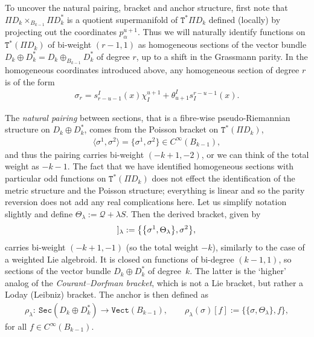 \documentclass[10pt,a4paper]{amsart}
\newcommand{\Dleft}{[\hspace{-1.5pt}[}
\newcommand{\Dright}{]\hspace{-1.5pt}]}
\newcommand{\SN}[1]{\Dleft #1 \Dright}
\def\Sec{\mathtt{Sec}}
\def\Vect{\mathtt{Vect}}
\def\sT{{\mathtt T}}
\numberwithin{equation}{section}
\begin{document}
To uncover the natural pairing, bracket and anchor structure, f\/irst note that $\Pi D_{k} \times_{B_{k-1}} \Pi D_{k}^{*}$ is a  quotient supermanifold of $\sT^{*}\Pi D_{k}$ def\/ined (locally) by projecting out the coordinates $p^{u+1}_{\alpha}$. Thus we will naturally identify functions on $\sT^{*}(\Pi D_{k})$ of bi-weight $(r-1,1)$ as homogeneous sections of  the vector bundle $D_k\oplus D^*_k=D_{k}\oplus_{B_{k-1}} D_{k}^{*}$ of degree $r$, up to a shift in the Grassmann parity.  In the homogeneous coordinates introduced above, any homogeneous section of degree $r$ is of the form
\begin{gather*}
\sigma_{r} = s_{r-u-1}^{I}(x)\chi_{I}^{u+1} + \theta_{u+1}^{I}s_{I}^{r-u-1}(x).
\end{gather*}


The \emph{natural pairing} between sections, that is a f\/ibre-wise pseudo-Riemannian structure on $D_{k}\oplus D_{k}^{*}$,  comes from the Poisson bracket on $\sT^{*}(\Pi D_{k})$,
\begin{gather*}
\langle\sigma^{1}, \sigma^{2} \rangle = \big\{ \sigma^{1}, \sigma^{2} \big\} \in C^{\infty}(B_{k-1}),
\end{gather*}
 and thus the pairing carries bi-weight $(-k+1, -2)$, or we can think of the  total weight as $-k-1$. The fact that we have identif\/ied homogeneous sections with particular odd functions on  $\sT^{*}(\Pi D_{k})$ does not ef\/fect the identif\/ication of the metric structure and the Poisson structure; everything is linear and so the parity reversion does not add any real complications here.
Let us simplify notation slightly and def\/ine  $\Theta_{\lambda} :=  \mathcal{Q} + \lambda   S$.  Then the  derived bracket, given by
\begin{gather*}
\SN{\sigma^{1}, \sigma^{2}}_{\lambda} :=  \big\{\big\{ \sigma^{1}, \Theta_{\lambda} \big\}, \sigma^{2} \big\},
\end{gather*}
carries bi-weight $(-k+1, -1)$  (so the total weight $-k$), similarly to the case of a weighted Lie algebroid. It is closed on functions of bi-degree $(k-1,1)$, so sections of the vector bundle $D_k\oplus D^*_k$ of degree~$k$. The latter is the `higher' analog of the \emph{Courant--Dorfman bracket}, which is not a Lie bracket, but rather a Loday (Leibniz) bracket. The anchor is then def\/ined as
\begin{gather*}
\rho_\lambda\colon \  \Sec( D_{k}\oplus D_{k}^{*} )  \rightarrow  \Vect(B_{k-1}),\qquad
  \rho_\lambda(\sigma)[f]  :=  \{\{ \sigma, \Theta_{\lambda} \}, f \},
\end{gather*}
 for all $f \in C^{\infty}(B_{k-1})$.
\end{document}
